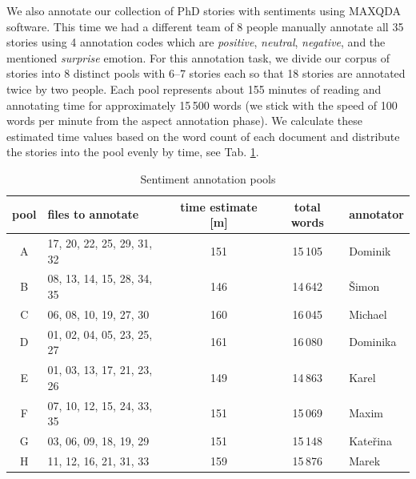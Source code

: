 \documentclass{kerauth}
\begin{document}
We also annotate our collection of PhD stories with sentiments using MAXQDA software. This time we had a different team of 8 people manually annotate all 35 stories using 4 annotation codes which are \textit{positive}, \textit{neutral}, \textit{negative}, and the mentioned \textit{surprise} emotion. For this annotation task, we divide our corpus of stories into 8 distinct pools with 6--7 stories each so that 18 stories are annotated twice by two people. Each pool represents about 155 minutes of reading and annotating time for approximately 15\,500 words (we stick with the speed of 100 words per minute from the aspect annotation phase). We calculate these estimated time values based on the word count of each document and distribute the stories into the pool evenly by time, see Tab. \ref{sentiment-annotation-pools}. 

\begin{table}[ht]
\small
\centering
\begin{tabular}{|c|l|c|c|l|}
\hline
\textbf{pool} & \textbf{files to annotate}    & \textbf{time estimate {[}m{]}} & \textbf{total words} & \textbf{annotator} \\ \hline
A             & 17, 20, 22, 25, 29, 31, 32    & 151                            & 15\,105              & Dominik            \\ \hline
B             & 08, 13, 14, 15, 28, 34, 35    & 146                            & 14\,642              & Šimon              \\ \hline
C             & 06, 08, 10, 19, 27, 30        & 160                            & 16\,045              & Michael            \\ \hline
D             & 01, 02, 04, 05, 23, 25, 27    & 161                            & 16\,080              & Dominika           \\ \hline
E             & 01, 03, 13, 17, 21, 23, 26    & 149                            & 14\,863              & Karel              \\ \hline
F             & 07, 10, 12, 15, 24, 33, 35    & 151                            & 15\,069              & Maxim              \\ \hline
G             & 03, 06, 09, 18, 19, 29        & 151                            & 15\,148              & Kateřina           \\ \hline
H             & 11, 12, 16, 21, 31, 33        & 159                            & 15\,876              & Marek              \\ \hline
\end{tabular}
\caption[sentiment-annotation-pools]{Sentiment annotation pools}
\label{sentiment-annotation-pools}
\end{table}
\end{document}
